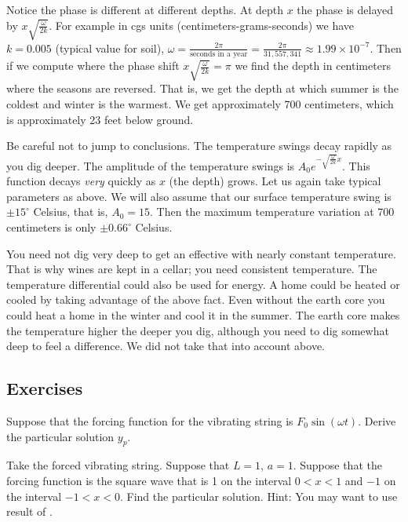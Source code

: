 \documentclass[12pt]{book}
\begin{document}
Notice the phase is different at different depths.  At depth $x$ the
phase is delayed by $x \sqrt{\frac{\omega}{2k}}$.
For example in cgs units (centimeters-grams-seconds)
we have $k=0.005$ (typical value for soil),
$\omega = \frac{2\pi}{\text{seconds in a year}}
= \frac{2\pi}{31,557,341} \approx 1.99 \times {10}^{-7}$.   Then
if we compute where the phase shift $x \sqrt{\frac{\omega}{2k}} = \pi$
we find the depth in centimeters where the seasons are reversed.  That is,
we get the depth at which summer is the coldest and winter is the warmest.
We get
approximately 700 centimeters, which is approximately 23 feet below ground.

Be careful not to jump to conclusions.  The temperature swings decay rapidly as you dig deeper.  The
amplitude of the temperature swings is
$A_0 e^{-\sqrt{\frac{\omega}{2k}} x}$.  This function decays \emph{very}
quickly as $x$ (the depth) grows.
Let us again take
typical parameters as above.  We will also assume that
our surface temperature swing is $\pm {15}^\circ$ Celsius, that is,
$A_0 = 15$.  Then the maximum temperature variation at 700 centimeters
is only $\pm {0.66}^\circ$ Celsius.

You need not dig very deep to get an effective
 with nearly constant temperature.  That is why wines are kept in a cellar; you need consistent
temperature.
The temperature differential could also be used for energy.  A home could
be heated or cooled by taking advantage of the above fact.
Even without the earth core you could heat a home in the winter and cool it
in the summer.  The earth core makes the
temperature higher the deeper you dig, although you need to dig somewhat
deep to feel a difference.
We did not take that into account above.

\subsection{Exercises}

\begin{exercise} \label{sps:sinforceexr}
Suppose that the forcing function for the vibrating string
is $F_0 \sin (\omega t)$.  Derive the particular solution $y_p$.
\end{exercise}

\begin{exercise}
Take the forced vibrating string.
Suppose that $L=1$, $a=1$.  Suppose that the forcing function
is the square wave that is 1 on the interval $0 < x < 1$ and
$-1$ on the interval $-1 < x< 0$.
Find the particular solution.  Hint: You may want to use result
of .
\end{exercise}
\end{document}
